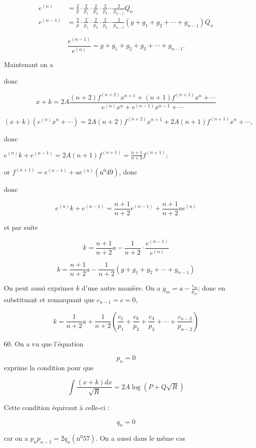 \documentclass{article}
\begin{document}
\[
\begin{aligned}
e^{(n)} & =\frac{2}{p} \cdot \frac{2}{p_{1}} \cdot \frac{2}{p_{2}} \cdot \frac{2}{p_{3}} \cdots \frac{2}{p_{n-1}} Q_{n} \\
e^{(n-1)} & =\frac{2}{p} \cdot \frac{2}{p_{1}} \cdot \frac{2}{p_{2}} \cdot \frac{2}{p_{3}} \cdots \frac{2}{p_{n-1}}\left(g+g_{1}+g_{2}+\cdots+g_{n-1}\right) Q_{n}
\end{aligned}
\]

\[
\frac{e^{(n-1)}}{e^{(n)}}=g+g_{1}+g_{2}+g_{3}+\cdots+g_{n-1} .
\]

Maintenant on a

donc

\[
x+k=2 A \frac{(n+2) f^{(n+2)} x^{n+1}+(n+1) f^{(n+1)} x^{n}+\cdots}{e^{(n)} x^{n}+e^{(n-1)} x^{n-1}+\cdots}
\]

\[
(x+k)\left(e^{(n)} x^{n}+\cdots\right)=2 A(n+2) f^{(n+2)} x^{n+1}+2 A(n+1) f^{(n+1)} x^{n}+\cdots,
\]

donc

\(e^{(n)} k+e^{(n-1)}=2 A(n+1) f^{(n+1)}=\frac{n+1}{n+2} f^{(n+1)} ;\)

or \(f^{(n+1)}=e^{(n-1)}+a e^{(n)}\left(\mathrm{n}^{0} 49\right)\), donc

donc

\[
e^{(n)} k+e^{(n-1)}=\frac{n+1}{n+2} e^{(n-1)}+\frac{n+1}{n+2} a e^{(n)}
\]

et par suite

\[
k=\frac{n+1}{n+2} a-\frac{1}{n+2} \cdot \frac{e^{(n-1)}}{e^{(n)}}
\]

\[
k=\frac{n+1}{n+2} a-\frac{1}{n+2}\left(g+g_{1}+g_{2}+\cdots+g_{n-1}\right)
\]

On peut aussi exprimer \(k\) d'une autre manière. On a \(g_{m}=a-\frac{c_{m}}{p_{m}}\); donc en substituant et remarquant que \(c_{n-1}=c=0\),

\[
k=\frac{1}{n+2} a+\frac{1}{n+2}\left(\frac{c_{1}}{p_{1}}+\frac{c_{8}}{p_{2}}+\frac{c_{3}}{p_{3}}+\cdots+\frac{c_{n-2}}{p_{n-2}}\right)
\]

60. On a vu que l'équation

\[
p_{n}=0
\]
exprime la condition pour que

\[
\int \frac{(x+k) d x}{\sqrt{R}}=2 A \log (P+Q \sqrt{R})
\]

Cette condition équivaut à celle-ci :

\[
q_{n}=0
\]

car on a \(p_{n} p_{n-1}=2 q_{n}\left(\mathrm{n}^{0} 57\right)\). On a aussi dans le même cas
\end{document}
